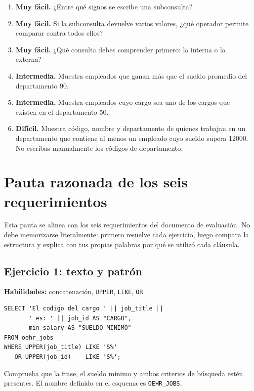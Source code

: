 \documentclass[11pt,a4paper]{article}
\newif\ifmostrarSoluciones
\newcommand{\campo}[1]{\texttt{#1}}
\newcommand{\tabla}[1]{\texttt{#1}}
\newcommand{\nivel}[1]{\textbf{#1}}
\begin{document}
\begin{enumerate}[label=\textbf{M7.\arabic*}]
  \item \nivel{Muy fácil.} ¿Entre qué signos se escribe una subconsulta?
  \item \nivel{Muy fácil.} Si la subconsulta devuelve varios valores, ¿qué operador permite comparar
  contra todos ellos?
  \item \nivel{Muy fácil.} ¿Qué consulta debes comprender primero: la interna o la externa?
  \item \nivel{Intermedia.} Muestra empleados que ganan más que el sueldo promedio del departamento
  90.
  \item \nivel{Intermedia.} Muestra empleados cuyo cargo sea uno de los cargos que existen en el
  departamento 50.
  \item \nivel{Difícil.} Muestra código, nombre y departamento de quienes trabajan en un departamento
  que contiene al menos un empleado cuyo sueldo supera 12000. No escribas manualmente los códigos de
  departamento.
\end{enumerate}

\ifmostrarSoluciones
\section{Pauta razonada de los seis requerimientos}

Esta pauta se alinea con los seis requerimientos del documento de evaluación. No debe memorizarse
literalmente: primero resuelve cada ejercicio, luego compara la estructura y explica con tus propias
palabras por qué se utilizó cada cláusula.

\subsection{Ejercicio 1: texto y patrón}

\textbf{Habilidades:} concatenación, \campo{UPPER}, \campo{LIKE}, \campo{OR}.

\begin{lstlisting}
SELECT 'El codigo del cargo ' || job_title ||
       ' es: ' || job_id AS "CARGO",
       min_salary AS "SUELDO MINIMO"
FROM oehr_jobs
WHERE UPPER(job_title) LIKE 'S%'
   OR UPPER(job_id)    LIKE 'S%';
\end{lstlisting}

Comprueba que la frase, el sueldo mínimo y ambos criterios de búsqueda estén presentes. El nombre
definido en el esquema es \tabla{OEHR\_JOBS}.
\end{document}
